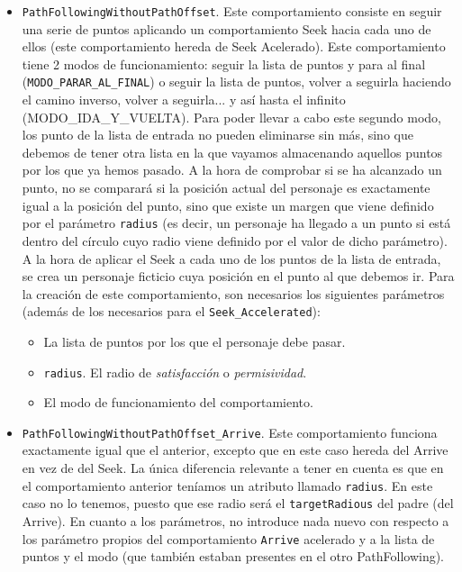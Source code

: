 \begin{itemize}
 \item \texttt{PathFollowingWithoutPathOffset}. Este comportamiento consiste en seguir una serie de puntos aplicando un comportamiento Seek hacia cada uno de ellos (este comportamiento hereda de Seek Acelerado). Este comportamiento tiene 2 modos de funcionamiento: seguir la lista de puntos y para al final (\texttt{MODO\_PARAR\_AL\_FINAL}) o seguir la lista de puntos, volver a seguirla haciendo el camino inverso, volver a seguirla... y así hasta el infinito (MODO\_IDA\_Y\_VUELTA). Para poder llevar a cabo este segundo modo, los punto de la lista de entrada no pueden eliminarse sin más, sino que debemos de tener otra lista en la que vayamos almacenando aquellos puntos por los que ya hemos pasado. A la hora de comprobar si se ha alcanzado un punto, no se comparará si la posición actual del personaje es exactamente igual a la posición del punto, sino que existe un margen que viene definido por el parámetro \texttt{radius} (es decir, un personaje ha llegado a un punto si está dentro del círculo cuyo radio viene definido por el valor de dicho parámetro). A la hora de aplicar el Seek a cada uno de los puntos de la lista de entrada, se crea un personaje ficticio cuya posición en el punto al que debemos ir. Para la creación de este comportamiento, son necesarios los siguientes parámetros (además de los necesarios para el \texttt{Seek\_Accelerated}):
 \begin{itemize}
 	\item La lista de puntos por los que el personaje debe pasar.
 	\item \texttt{radius}. El radio de \textit{satisfacción} o \textit{permisividad}.
 	\item El modo de funcionamiento del comportamiento.
 \end{itemize}
 
 \item \texttt{PathFollowingWithoutPathOffset\_Arrive}. Este comportamiento funciona exactamente igual que el anterior, excepto que en este caso hereda del Arrive en vez de del Seek. La única diferencia relevante a tener en cuenta es que en el comportamiento anterior teníamos un atributo llamado \texttt{radius}. En este caso no lo tenemos, puesto que ese radio será el \texttt{targetRadious} del padre (del Arrive). En cuanto a los parámetros, no introduce nada nuevo con respecto a los parámetro propios del comportamiento \texttt{Arrive} acelerado y a la lista de puntos y el modo (que también estaban presentes en el otro PathFollowing).
 

\end{itemize}
